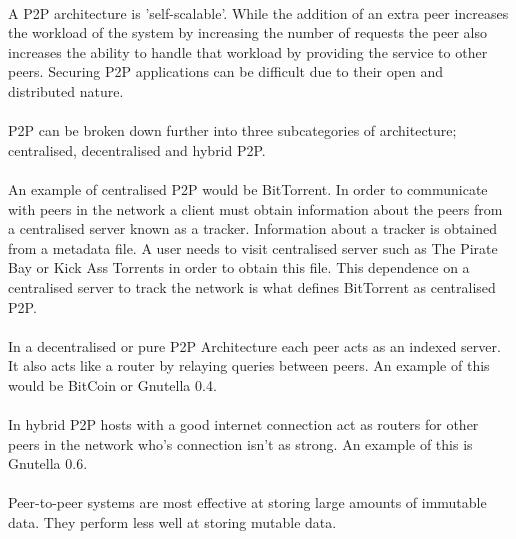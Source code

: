 \documentclass[11pt]{amsart}
\begin{document}
\paragraph{}
A P2P architecture is 'self-scalable'. While the addition of an extra peer increases the workload of the system by increasing the number of requests the peer also increases the ability to handle that workload by providing the service to other peers. Securing P2P applications can be difficult due to their open and distributed nature.
\paragraph{}
P2P can be broken down further into three subcategories of architecture; centralised, decentralised and hybrid P2P.
\paragraph{}
An example of centralised P2P would be BitTorrent. In order to communicate with peers in the network a client must obtain information about the peers from a centralised server known as a tracker. Information about a tracker is obtained from a metadata file. A user needs to visit centralised server such as The Pirate Bay or Kick Ass Torrents in order to obtain this file. This dependence on a centralised server to track the network is what defines BitTorrent as centralised P2P.
\paragraph{}
In a decentralised or pure P2P Architecture each peer acts as an indexed server. It also acts like a router by relaying queries between peers. An example of this would be BitCoin or Gnutella 0.4.
\paragraph{}
In hybrid P2P hosts with a good internet connection act as routers for other peers in the network who's connection isn't as strong. An example of this is Gnutella 0.6.

\paragraph{}
Peer-to-peer systems are most effective at storing large amounts of immutable data. They perform less well at storing mutable data.\cite{DistSys}
\end{document}
